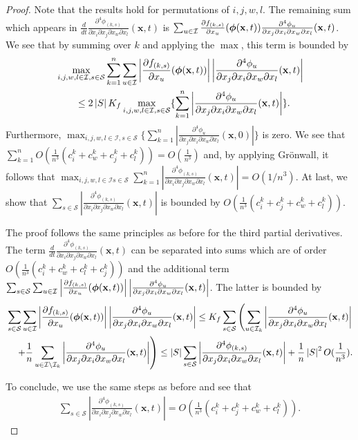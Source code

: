 \documentclass[acmsmall]{acmart}
\newcommand\bx{\mathbf{x}}
\newcommand\bphi{\text{\boldmath$\phi$}}
\newcommand\calI{\mathcal{I}}
\newcommand\calS{\mathcal{S}}
\newcommand\abs[1]{\left|#1\right|}         %
\newcommand{\dddd}[5]{ \frac{\partial^4 #1 }{ \partial x_{#2} \partial x_{#3} \partial x_{#4} \partial x_{#5} }}
\begin{document}
\begin{proof}
\color{black}

Note that the results hold for permutations of $i,j,w,l$.
The remaining sum which appears in $\frac{d}{dt} \dddd{\phi_{(k,s)}}{i}{j}{w}{l}(\bx,t)$ is $\sum_{u \in \calI} \frac{\partial f_{(k,s)}}{\partial x_u}(\bphi (\bx,t)) \dddd{\phi_{u}}{j}{i}{w}{l}(\bx,t)$. We see that by summing over $k$ and applying the $\max$, this term is bounded by
\begin{align*}
& \max_{i,j,w,l\in \calI ,s\in \calS} \sum_{k=1}^{n}  \sum_{u \in \calI} \abs{\frac{\partial f_{(k,s)}}{\partial x_u}(\bphi (\bx,t))} \abs{\dddd{\phi_{u}}{j}{i}{w}{l}(\bx,t)} \\
& \qquad \leq 2\abs{S}K_f \max_{i,j,w,l\in \calI,s\in \calS} \{\sum_{k=1}^{n} \abs{\dddd{\phi_{u}}{j}{i}{w}{l}(\bx,t)}\}.
\end{align*} 
Furthermore, $\max_{i,j,w,l\in \calI,s\in \calS} \{\sum_{k=1}^{n} \abs{\dddd{\phi_{u}}{j}{i}{w}{l}(\bx,0)}\}$ is zero. We see that $\sum_{k=1}^{n} O(\frac{1}{n^3}(c^k_{i} + c^k_{w} + c^k_{j} + c^k_{l})) = O(\frac{1}{n^3})$ and, by applying Grönwall, it follows that $\max_{i,j,w,l \in \calI s\in \calS} \sum_{k=1}^{n} \abs{\dddd{\phi_{(k,s)}}{i}{j}{w}{l}(\bx,t)} = O(1/n^3)$. At last, we show that $\sum_{s\in \calS} \abs{\dddd{\phi_{(k,s)}}{i}{j}{w}{l}(\bx,t)}$ is bounded by $O\left( \frac{1}{n^3}(c^k_{i} + c^k_{j} + c^k_{w} + c^k_{l}) \right)$.

The proof follows the same principles as before for the third partial derivatives. The term $\frac{d}{dt} \dddd{\phi_{(k,s)}}{i}{j}{w}{l}(\bx,t)$ can be separated into sums which are of order $O(\frac{1}{n^3}(c^k_{i} + c^k_{w} + c^k_{l} + c^k_{j}))$ and the additional term $\sum_{s\in \calS} \sum_{u \in \calI} \abs{\frac{\partial f_{(k,s)}}{\partial x_u}(\bphi (\bx,t))} \abs{\dddd{\phi_{u}}{j}{i}{w}{l}(\bx,t)}$. The latter is bounded by 
\begin{align*}
& \sum_{s\in \calS} \sum_{u \in \calI} \abs{\frac{\partial f_{(k,s)}}{\partial x_u}(\bphi (\bx,t))} \abs{\dddd{\phi_{u}}{j}{i}{w}{l}(\bx,t)} \leq  K_f\sum_{s\in \calS} \left( \sum_{u \in \calI_k} \abs{\dddd{\phi_{u}}{j}{i}{w}{l}(\bx,t)} \right. \\
& \quad \left. + \frac{1}{n} \sum_{u \in \calI \setminus \calI_k}  \abs{\dddd{\phi_{u}}{j}{i}{w}{l}(\bx,t)} \right) 
\leq \abs{S} \sum_{s\in \calS}  \abs{\dddd{\phi_{(k,s)}}{j}{i}{w}{l}(\bx,t)} + \frac{1}{n}\abs{S}^2 O(\frac{1}{n^3}).
\end{align*}

To conclude, we use the same steps as before and see that  
\begin{align*}
\sum_{s\in \calS} \abs{\dddd{\phi_{(k,s)}}{i}{j}{w}{l}(\bx,t)} = O\left( \frac{1}{n^3}(c^k_{i} + c^k_{j} + c^k_{w} + c^k_{l}) \right). 
\end{align*}
\end{proof}
\end{document}
